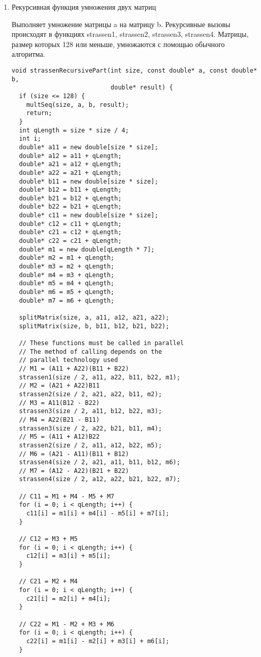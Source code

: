 \documentclass{report}
\begin{document}
\begin{center}
\begin{enumerate}
\item Рекурсивная функция умножения двух матриц
\par Выполняет умножение матрицы a на матрицу b. Рекурсивные вызовы происходят в функциях strassen1, strassen2, strassen3, strassen4. Матрицы, размер которых 128 или меньше, умножаются с помощью обычного алгоритма.
\begin{lstlisting}
void strassenRecursivePart(int size, const double* a, const double* b,
                           double* result) {
  if (size <= 128) {
    multSeq(size, a, b, result);
    return;
  }
  int qLength = size * size / 4;
  int i;
  double* a11 = new double[size * size];
  double* a12 = a11 + qLength;
  double* a21 = a12 + qLength;
  double* a22 = a21 + qLength;
  double* b11 = new double[size * size];
  double* b12 = b11 + qLength;
  double* b21 = b12 + qLength;
  double* b22 = b21 + qLength;
  double* c11 = new double[size * size];
  double* c12 = c11 + qLength;
  double* c21 = c12 + qLength;
  double* c22 = c21 + qLength;
  double* m1 = new double[qLength * 7];
  double* m2 = m1 + qLength;
  double* m3 = m2 + qLength;
  double* m4 = m3 + qLength;
  double* m5 = m4 + qLength;
  double* m6 = m5 + qLength;
  double* m7 = m6 + qLength;

  splitMatrix(size, a, a11, a12, a21, a22);
  splitMatrix(size, b, b11, b12, b21, b22);

  // These functions must be called in parallel
  // The method of calling depends on the
  // parallel technology used
  // M1 = (A11 + A22)(B11 + B22)
  strassen1(size / 2, a11, a22, b11, b22, m1);
  // M2 = (A21 + A22)B11
  strassen2(size / 2, a21, a22, b11, m2);
  // M3 = A11(B12 - B22)
  strassen3(size / 2, a11, b12, b22, m3);
  // M4 = A22(B21 - B11)
  strassen3(size / 2, a22, b21, b11, m4);
  // M5 = (A11 + A12)B22
  strassen2(size / 2, a11, a12, b22, m5);
  // M6 = (A21 - A11)(B11 + B12)
  strassen4(size / 2, a21, a11, b11, b12, m6);
  // M7 = (A12 - A22)(B21 + B22)
  strassen4(size / 2, a12, a22, b21, b22, m7);

  // C11 = M1 + M4 - M5 + M7
  for (i = 0; i < qLength; i++) {
    c11[i] = m1[i] + m4[i] - m5[i] + m7[i];
  }

  // C12 = M3 + M5
  for (i = 0; i < qLength; i++) {
    c12[i] = m3[i] + m5[i];
  }

  // C21 = M2 + M4
  for (i = 0; i < qLength; i++) {
    c21[i] = m2[i] + m4[i];
  }

  // C22 = M1 - M2 + M3 + M6
  for (i = 0; i < qLength; i++) {
    c22[i] = m1[i] - m2[i] + m3[i] + m6[i];
  }


\end{lstlisting}
\end{enumerate}
\end{center}
\end{document}
